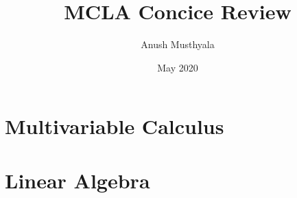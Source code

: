 \documentclass{report}
\begin{document}
\title{\Large{\textbf{MCLA Concice Review}}}
\author{Anush Musthyala}
\date{May 2020}

\maketitle
\tableofcontents

\clearpage
{}

\part{Multivariable Calculus}











\part{Linear Algebra}









\end{document}
